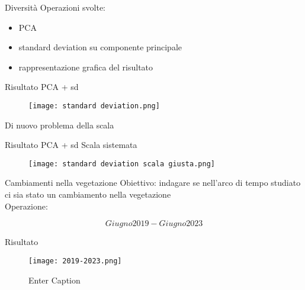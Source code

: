 \documentclass{beamer} %
\begin{document}
\begin{frame}{Diversità}
Operazioni svolte: 
    \begin{itemize}
        \item PCA
        \item standard deviation su componente principale 
        \item rappresentazione grafica del risultato
    \end{itemize}
\end{frame}

\begin{frame}{Risultato PCA + sd}

\begin{figure}
    \centering
    \texttt{[image: standard deviation.png]}
    \label{fig:enter-label}
\end{figure}
Di nuovo problema della scala 
\end{frame}

\begin{frame}{Risultato PCA + sd}
Scala sistemata

\begin{figure}
    \centering
    \texttt{[image: standard deviation scala giusta.png]}
    \label{fig:enter-label}
\end{figure}
\end{frame}

\begin{frame}{Cambiamenti nella vegetazione}
Obiettivo: indagare se nell'arco di tempo studiato ci sia stato un cambiamento nella vegetazione \\
Operazione: 

\begin{equation}
    Giugno 2019 - Giugno 2023
\end{equation}

\end{frame}

\begin{frame}{Risultato}
\begin{figure}
     \centering
     \texttt{[image: 2019-2023.png]}
     \caption{Enter Caption}
     \label{fig:enter-label}
 \end{figure} 
\end{frame}
\end{document}
